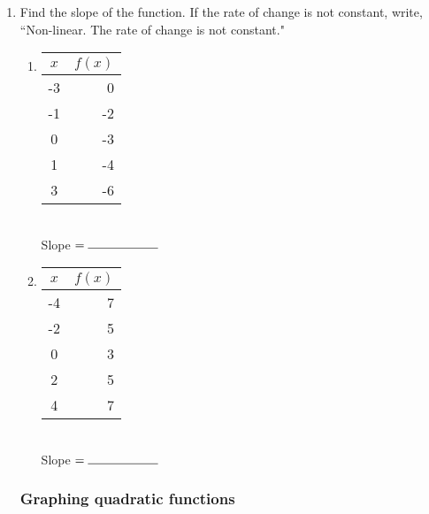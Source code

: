 \documentclass[12pt, twoside]{article}
\begin{document}
\begin{enumerate}
\begin{enumerate}
  \item Find the slope of the function. If the rate of change is not constant, write, ``Non-linear. The rate of change is not constant."

    \begin{multicols}{2}
    \begin{enumerate}
      \item
        \begin{tabular}{|c|r|}
          \hline
          $x$ & $f(x)$\\
          \hline
          -3 & 0 \\
          \hline
          -1 & -2 \\
          \hline
          0 & -3 \\
          \hline
          1 & -4 \\
          \hline
          3 & -6 \\
          \hline
        \end{tabular}\\[0.85cm]

        Slope $= \rule{2cm}{0.15mm}$\\


      \item
        \begin{tabular}{|c|r|}
          \hline
          $x$ & $f(x)$\\
          \hline
          -4 & 7 \\
          \hline
          -2 & 5 \\
          \hline
          0 & 3 \\
          \hline
          2 & 5 \\
          \hline
          4 & 7 \\
          \hline
        \end{tabular}\\[0.85cm]

        Slope $= \rule{2cm}{0.15mm}$\\

      \end{enumerate}
    \end{multicols}

    \newpage
          \subsubsection*{Graphing quadratic functions}


\end{enumerate}
\end{enumerate}
\end{document}
